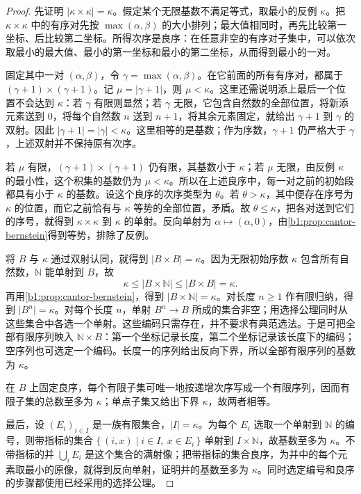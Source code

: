 \begin{proof}
	先证明 \(\lvert\kappa\times\kappa\rvert=\kappa\)。假定某个无限基数不满足等式，取最小的反例 \(\kappa\)。把 \(\kappa\times\kappa\) 中的有序对先按 \(\max(\alpha,\beta)\) 的大小排列；最大值相同时，再先比较第一坐标、后比较第二坐标。所得次序是良序：在任意非空的有序对子集中，可以依次取最小的最大值、最小的第一坐标和最小的第二坐标，从而得到最小的一对。

	固定其中一对 \((\alpha,\beta)\)，令 \(\gamma=\max(\alpha,\beta)\)。在它前面的所有有序对，都属于 \((\gamma+1)\times(\gamma+1)\)。记 \(\mu=\lvert\gamma+1\rvert\)，则 \(\mu<\kappa\)。这里还需说明添上最后一个位置不会达到 \(\kappa\)：若 \(\gamma\) 有限则显然；若 \(\gamma\) 无限，它包含自然数的全部位置，将新添元素送到 \(0\)，将每个自然数 \(n\) 送到 \(n+1\)，将其余元素固定，就给出 \(\gamma+1\) 到 \(\gamma\) 的双射。因此 \(\lvert\gamma+1\rvert=\lvert\gamma\rvert<\kappa\)。这里相等的是基数；作为序数，\(\gamma+1\) 仍严格大于 \(\gamma\)，上述双射并不保持原有次序。

	若 \(\mu\) 有限，\((\gamma+1)\times(\gamma+1)\) 仍有限，其基数小于 \(\kappa\)；若 \(\mu\) 无限，由反例 \(\kappa\) 的最小性，这个积集的基数仍为 \(\mu<\kappa\)。所以在上述良序中，每一对之前的初始段都具有小于 \(\kappa\) 的基数。设这个良序的次序类型为 \(\theta\)。若 \(\theta>\kappa\)，其中便存在序号为 \(\kappa\) 的位置，而它之前恰有与 \(\kappa\) 等势的全部位置，矛盾。故 \(\theta\leq\kappa\)，把各对送到它们的序号，就得到 \(\kappa\times\kappa\) 到 \(\kappa\) 的单射。反向单射为 \(\alpha\mapsto(\alpha,0)\)，由\cref{b1:prop:cantor-bernstein}得到等势，排除了反例。

	将 \(B\) 与 \(\kappa\) 通过双射认同，就得到 \(\lvert B\times B\rvert=\kappa\)。因为无限初始序数 \(\kappa\) 包含所有自然数，\(\mathbb N\) 能单射到 \(B\)，故
	\[
		\kappa\leq\lvert B\times\mathbb N\rvert \leq\lvert B\times B\rvert=\kappa.
	\]
	再用\cref{b1:prop:cantor-bernstein}，得到 \(\lvert B\times\mathbb N\rvert=\kappa\)。对长度 \(n\geq1\) 作有限归纳，得到 \(\lvert B^n\rvert=\kappa\)。对每个长度 \(n\)，单射 \(B^n\rightarrow B\) 所成的集合非空；用选择公理同时从这些集合中各选一个单射。这些编码只需存在，并不要求有典范选法。于是可把全部有限序列映入 \(\mathbb N\times B\)：第一个坐标记录长度，第二个坐标记录该长度下的编码；空序列也可选定一个编码。长度一的序列给出反向下界，所以全部有限序列的基数为 \(\kappa\)。

	在 \(B\) 上固定良序，每个有限子集可唯一地按递增次序写成一个有限序列，因而有限子集的总数至多为 \(\kappa\)；单点子集又给出下界 \(\kappa\)，故两者相等。

	最后，设 \((E_i)_{i\in I}\) 是一族有限集合，\(\lvert I\rvert=\kappa\)。为每个 \(E_i\) 选取一个单射到 \(\mathbb N\) 的编号，则带指标的集合 \(\bigl\{\,(i,x)\mid i\in I,\ x\in E_i\,\bigr\}\) 单射到 \(I\times\mathbb N\)，故基数至多为 \(\kappa\)。不带指标的并 \(\bigcup_iE_i\) 是这个集合的满射像；把带指标的集合良序，为并中的每个元素取最小的原像，就得到反向单射，证明并的基数至多为 \(\kappa\)。同时选定编号和良序的步骤都使用已经采用的选择公理。
\end{proof}

